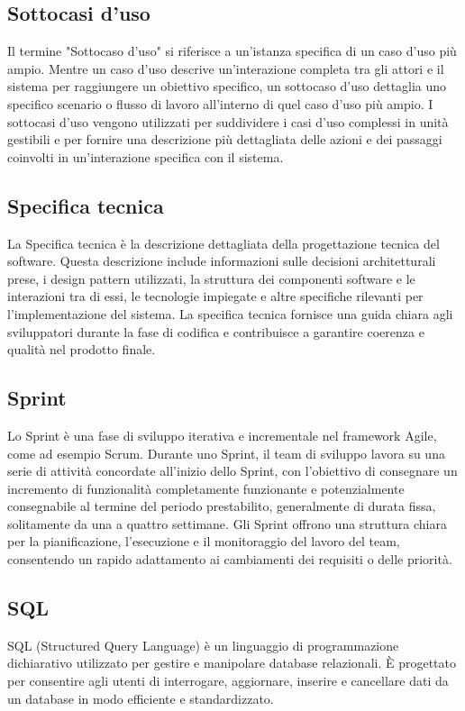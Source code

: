 \subsection*{Sottocasi d'uso} 
Il termine "Sottocaso d'uso" si riferisce a un'istanza specifica di un caso d'uso più ampio. Mentre un caso d'uso descrive un'interazione completa tra gli attori e il sistema per raggiungere un obiettivo specifico, un sottocaso d'uso dettaglia uno specifico scenario o flusso di lavoro all'interno di quel caso d'uso più ampio. I sottocasi d'uso vengono utilizzati per suddividere i casi d'uso complessi in unità gestibili e per fornire una descrizione più dettagliata delle azioni e dei passaggi coinvolti in un'interazione specifica con il sistema. 
\subsection*{Specifica tecnica} 
La Specifica tecnica è la descrizione dettagliata della progettazione tecnica del software. Questa descrizione include informazioni sulle decisioni architetturali prese, i design pattern utilizzati, la struttura dei componenti software e le interazioni tra di essi, le tecnologie impiegate e altre specifiche rilevanti per l'implementazione del sistema. La specifica tecnica fornisce una guida chiara agli sviluppatori durante la fase di codifica e contribuisce a garantire coerenza e qualità nel prodotto finale. 
\subsection*{Sprint} 
Lo Sprint è una fase di sviluppo iterativa e incrementale nel framework Agile, come ad esempio Scrum. Durante uno Sprint, il team di sviluppo lavora su una serie di attività concordate all'inizio dello Sprint, con l'obiettivo di consegnare un incremento di funzionalità completamente funzionante e potenzialmente consegnabile al termine del periodo prestabilito, generalmente di durata fissa, solitamente da una a quattro settimane. Gli Sprint offrono una struttura chiara per la pianificazione, l'esecuzione e il monitoraggio del lavoro del team, consentendo un rapido adattamento ai cambiamenti dei requisiti o delle priorità. 
\subsection*{SQL} 
SQL (Structured Query Language) è un linguaggio di programmazione dichiarativo utilizzato per gestire e manipolare database relazionali. È progettato per consentire agli utenti di interrogare, aggiornare, inserire e cancellare dati da un database in modo efficiente e standardizzato.
